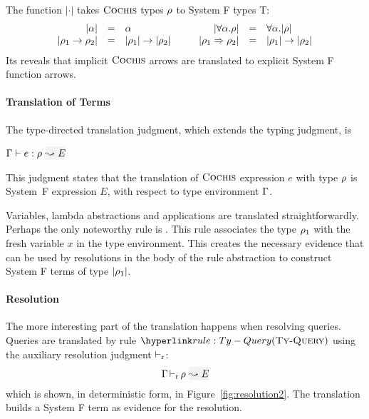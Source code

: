 The function $|\cdot|$ takes 
$\textsc{Cochis}$ types $\rho$ to System F types T: 
\begin{equation*}
\begin{array}{rcl@{\hspace{1cm}}rcl}
|\alpha| & = & \alpha &
|\forall \alpha. \rulet| & = & \forall \alpha. |\rulet| \\
|\rulet_1 \arrow \rulet_2| & = & |\rulet_1| \arrow |\rulet_2| &
|\rulet_1 \iarrow \rulet_2| & = & |\rulet_1| \arrow |\rulet_2| %
\end{array}
\end{equation*}
Its reveals that implicit $\textsc{Cochis}$ arrows are translated to explicit System F function arrows.

\paragraph{Translation of Terms}

The type-directed translation judgment, which extends the typing judgment, is 
\begin{center}
  $\tenv \turns \relation{e}{\rulet}~\gbox{\leadsto E}$
\end{center}
This judgment states that the translation of $\textsc{Cochis}$ expression $e$ with
type $\rho$ is System~F expression $E$, with respect to type environment
$\Gamma$.

Variables, lambda abstractions and applications
are translated straightforwardly. Perhaps the only noteworthy 
rule is \TyIAbs. This rule associates the type $\rho_1$ with 
the fresh variable $x$ in the type environment. 
This creates the necessary evidence that can be used by resolutions 
in the body of the rule abstraction to construct System F terms of type $|\rho_1|$. 

\paragraph{Resolution}
The more interesting part of the translation happens when resolving queries.
Queries are translated by rule $\rref{Ty-Query}$ using the auxiliary resolution
judgment $\mathop{\vdash_{\mathrm{r}}}$:
\begin{equation*}
\tenv \ivturns \rulet~\gbox{\leadsto E}
\end{equation*}
which is shown, in deterministic form, in Figure~\ref{fig:resolution2}.  The
translation builds a System F term as evidence for the resolution.  

